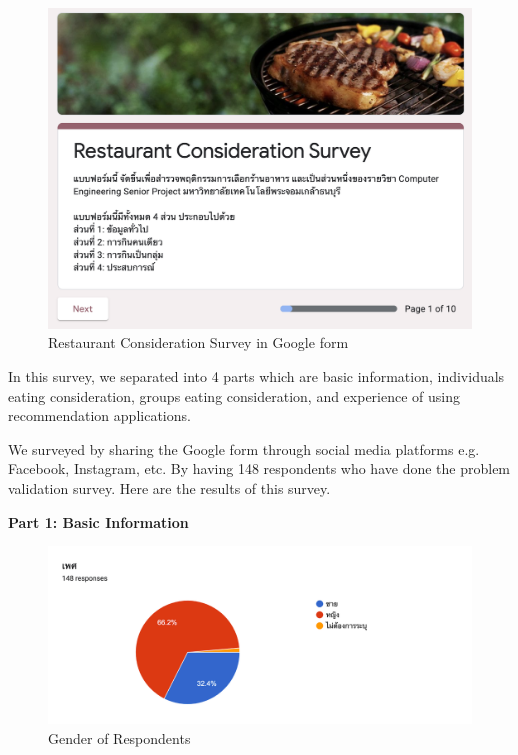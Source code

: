 \documentclass[12pt,oneside,openright,a4paper]{cpe-english-project}
\begin{document}
\begin{figure}[H]\centering
\includegraphics[width=350pt]{./images/A1RestaurantConsiderationSurveyinGoogleform.png}
\caption{Restaurant Consideration Survey in Google form}\label{fig:A1RestaurantConsiderationSurveyinGoogleform}
\end{figure}\vspace{-24pt}

In this survey, we separated into 4 parts which are basic information, individuals eating consideration, groups eating consideration, and experience of using recommendation applications.

We surveyed by sharing the Google form through social media platforms e.g. Facebook, Instagram, etc. By having 148 respondents who have done the problem validation survey. Here are the results of this survey.

\textbf{Part 1: Basic Information}

\begin{figure}[H]\centering
\includegraphics[width=350pt]{./images/A1GenderofRespondents.png}
\caption{Gender of Respondents}\label{fig:A1GenderofRespondents}
\end{figure}\vspace{-24pt}
\end{document}
